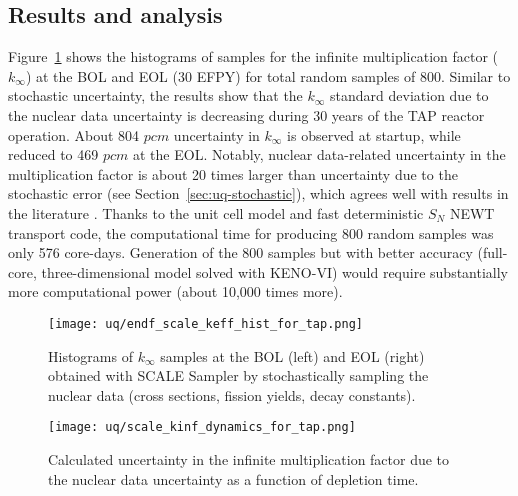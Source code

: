 \subsection{Results and analysis}
Figure~\ref{fig:uq-scale-kinf-hist} shows the histograms of samples for the 
infinite multiplication factor ($k_{\infty}$) at the \gls{BOL} and \gls{EOL} 
(30 \gls{EFPY}) for total random samples of 800. Similar to stochastic 
uncertainty, the results show that the $k_{\infty}$ standard deviation due to 
the nuclear data uncertainty is decreasing during 30 years of the \gls{TAP} 
reactor operation. About 804 $pcm$ uncertainty in $k_{\infty}$ is observed at 
startup, while reduced to 469 $pcm$ at the \gls{EOL}. Notably, nuclear 
data-related uncertainty in the multiplication factor is about 20 times larger 
than uncertainty due to the stochastic error (see 
Section~\ref{sec:uq-stochastic}), which agrees well with results in the 
literature \cite{takeda_estimation_1999, garcia-herranz_propagation_2008}. 
Thanks to the unit cell model and fast deterministic $S_N$ NEWT transport 
code, the computational time for producing 800 random samples was only 576 
core-days. Generation of the 800 samples but with better accuracy (full-core, 
three-dimensional model solved with KENO-VI) would require substantially more 
computational power (about 10,000 times more).
\begin{figure}[htp!] %
	\centering
	\texttt{[image: uq/endf\_scale\_keff\_hist\_for\_tap.png]}
		\vspace{-8mm}
	\caption{Histograms of $k_{\infty}$ samples at the \gls{BOL} (left) and 
		\gls{EOL} (right) obtained with SCALE Sampler by stochastically 
		sampling the nuclear data (cross sections, fission yields, decay 
		constants).}
	\label{fig:uq-scale-kinf-hist}
\end{figure}
\begin{figure}[hbp!] %
	\centering
	\texttt{[image: uq/scale\_kinf\_dynamics\_for\_tap.png]}
	\caption{Calculated uncertainty in the infinite multiplication factor due 
		to the nuclear data uncertainty as a function of depletion time.}
	\label{fig:uq-scale-kinf}
\end{figure}

